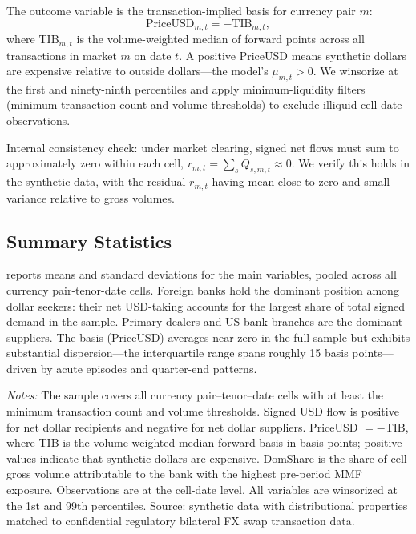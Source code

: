 The outcome variable is the transaction-implied basis for currency pair $m$:
\[
  \text{PriceUSD}_{m,t} = -\text{TIB}_{m,t},
\]
where $\text{TIB}_{m,t}$ is the volume-weighted median of forward points across
all transactions in market $m$ on date $t$. A positive PriceUSD means synthetic
dollars are expensive relative to outside dollars---the model's $\mu_{m,t} > 0$.
We winsorize at the first and ninety-ninth percentiles and apply minimum-liquidity
filters (minimum transaction count and volume thresholds) to exclude illiquid
cell-date observations.

Internal consistency check: under market clearing, signed net flows must sum to
approximately zero within each cell, $r_{m,t} = \sum_s Q_{s,m,t} \approx 0$.
We verify this holds in the synthetic data, with the residual $r_{m,t}$ having
mean close to zero and small variance relative to gross volumes.

\subsection{Summary Statistics}
\label{subsec:summary-stats}

 reports means and standard deviations for the main
variables, pooled across all currency pair-tenor-date cells. Foreign banks hold
the dominant position among dollar seekers: their net USD-taking accounts for
the largest share of total signed demand in the sample. Primary dealers and US
bank branches are the dominant suppliers. The basis (PriceUSD) averages near
zero in the full sample but exhibits substantial dispersion---the interquartile
range spans roughly 15 basis points---driven by acute episodes and quarter-end
patterns.

\begin{table}[htbp]
\centering
\begin{threeparttable}
\caption{Summary Statistics}
\label{tab:summary-stats}

\begin{tablenotes}\small
\item \textit{Notes:} The sample covers all currency pair--tenor--date cells with
at least the minimum transaction count and volume thresholds. Signed USD flow is
positive for net dollar recipients and negative for net dollar suppliers.
PriceUSD $= -$TIB, where TIB is the volume-weighted median forward basis in
basis points; positive values indicate that synthetic dollars are expensive.
DomShare is the share of cell gross volume attributable to the bank with the
highest pre-period MMF exposure. Observations are at the cell-date level.
All variables are winsorized at the 1st and 99th percentiles. Source: synthetic
data with distributional properties matched to confidential regulatory bilateral
FX swap transaction data.
\end{tablenotes}
\end{threeparttable}
\end{table}

